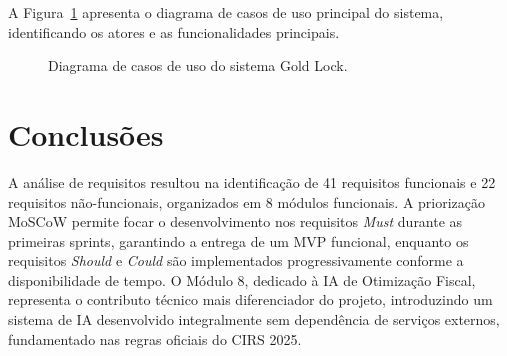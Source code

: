 A Figura~\ref{fig:casos-uso} apresenta o diagrama de casos de uso principal do sistema, identificando os atores e as funcionalidades principais.

\begin{figure}[H]
\centering

\caption{Diagrama de casos de uso do sistema Gold Lock.}
\label{fig:casos-uso}
\end{figure}


\section{Conclusões}
\label{sec:req-conclusoes}

A análise de requisitos resultou na identificação de 41 requisitos funcionais e 22 requisitos não-funcionais, organizados em 8 módulos funcionais. A priorização MoSCoW permite focar o desenvolvimento nos requisitos \textit{Must} durante as primeiras sprints, garantindo a entrega de um \ac{MVP} funcional, enquanto os requisitos \textit{Should} e \textit{Could} são implementados progressivamente conforme a disponibilidade de tempo. O Módulo 8, dedicado à \ac{IA} de Otimização Fiscal, representa o contributo técnico mais diferenciador do projeto, introduzindo um sistema de \ac{IA} desenvolvido integralmente sem dependência de serviços externos, fundamentado nas regras oficiais do \ac{CIRS} 2025.
